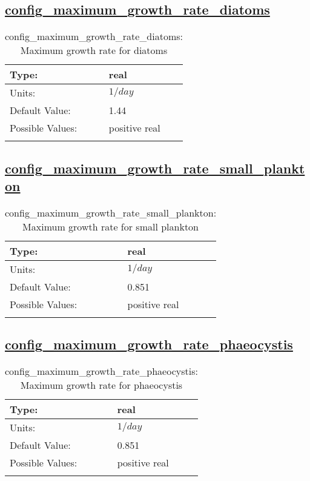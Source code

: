 \subsection[config\_maximum\_growth\_rate\_diatoms]{\hyperref[sec:nm_tab_biogeochemistry]{config\_maximum\_growth\_rate\_diatoms}}
\label{subsec:nm_sec_config_maximum_growth_rate_diatoms}
\begin{center}
\begin{longtable}{| p{2.0in} || p{4.0in} |}
    \hline
    Type: & real \\
    \hline
    Units: & $1/day$ \\
    \hline
    Default Value: & 1.44 \\
    \hline
    Possible Values: & positive real \\
    \hline
    \caption{config\_maximum\_growth\_rate\_diatoms: Maximum growth rate for diatoms}
\end{longtable}
\end{center}
\subsection[config\_maximum\_growth\_rate\_small\_plankton]{\hyperref[sec:nm_tab_biogeochemistry]{config\_maximum\_growth\_rate\_small\_plankton}}
\label{subsec:nm_sec_config_maximum_growth_rate_small_plankton}
\begin{center}
\begin{longtable}{| p{2.0in} || p{4.0in} |}
    \hline
    Type: & real \\
    \hline
    Units: & $1/day$ \\
    \hline
    Default Value: & 0.851 \\
    \hline
    Possible Values: & positive real \\
    \hline
    \caption{config\_maximum\_growth\_rate\_small\_plankton: Maximum growth rate for small plankton}
\end{longtable}
\end{center}
\subsection[config\_maximum\_growth\_rate\_phaeocystis]{\hyperref[sec:nm_tab_biogeochemistry]{config\_maximum\_growth\_rate\_phaeocystis}}
\label{subsec:nm_sec_config_maximum_growth_rate_phaeocystis}
\begin{center}
\begin{longtable}{| p{2.0in} || p{4.0in} |}
    \hline
    Type: & real \\
    \hline
    Units: & $1/day$ \\
    \hline
    Default Value: & 0.851 \\
    \hline
    Possible Values: & positive real \\
    \hline
    \caption{config\_maximum\_growth\_rate\_phaeocystis: Maximum growth rate for phaeocystis}
\end{longtable}
\end{center}
